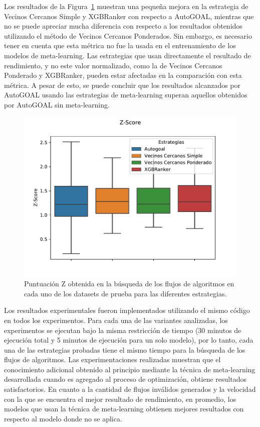 Los resultados de la Figura~\ref{fig:zscore} muestran una pequeña mejora en la estrategia de Vecinos Cercanos Simple y XGBRanker con respecto a AutoGOAL, mientras que no se puede apreciar mucha diferencia con respecto a los resultados obtenidos utilizando el método de Vecinos Cercanos Ponderados. Sin embargo, es necesario tener en cuenta que esta métrica no fue la usada en el entrenamiento de los modelos de meta-learning. Las estrategias que usan directamente el resultado de rendimiento, y no este valor normalizado, como la de Vecinos Cercanos Ponderado y XGBRanker, pueden estar afectadas en la comparación con esta métrica. A pesar de esto, se puede concluir que los resultados alcanzados por AutoGOAL usando las estrategias de meta-learning superan aquellos obtenidos por AutoGOAL sin meta-learning.

\begin{figure}[H]
	\centering
	\includegraphics[scale=.8]{Figures/z-score.pdf}
	\caption{Puntuación Z obtenida en la búsqueda de los flujos de algoritmos en cada uno de los datasets de prueba para las diferentes estrategias.}
	\label{fig:zscore}
\end{figure}

Los resultados experimentales fueron implementados utilizando el mismo código en todos los experimentos. Para cada una de las variantes analizadas, los experimentos se ejecutan bajo la misma restricción de tiempo (30 minutos de ejecución total y 5 minutos de ejecución para un solo modelo), por lo tanto, cada una de las estrategias probadas tiene el mismo tiempo para la búsqueda de los flujos de algoritmos. Las experimentaciones realizadas muestran que el conocimiento adicional obtenido al principio mediante la técnica de meta-learning desarrollada cuando es agregado al proceso de optimización, obtiene resultados satisfactorios. En cuanto a la cantidad de flujos inválidos generados y la velocidad con la que se encuentra el mejor resultado de rendimiento, en promedio, los modelos que usan la técnica de meta-learning obtienen mejores resultados con respecto al modelo donde no se aplica.


